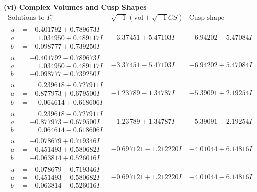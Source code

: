 \documentclass[1p]{elsarticle_modified}
\theoremstyle{definition}
\newcommand{\I}{\sqrt{-1}}
\begin{document}
\newpage\flushleft \textbf{(vi) Complex Volumes and Cusp Shapes}
$$\begin{array}{c|c|c}  
\text{Solutions to }I^u_{1}& \I (\text{vol} + \sqrt{-1}CS) & \text{Cusp shape}\\
 \hline 
\begin{aligned}
u &= -0.401792 + 0.789673 I \\
a &= \phantom{-}1.034950 + 0.489117 I \\
b &= -0.098777 + 0.739250 I\end{aligned}
 & -3.37451 + 5.47103 I & -6.94202 - 5.47084 I \\ \hline\begin{aligned}
u &= -0.401792 - 0.789673 I \\
a &= \phantom{-}1.034950 - 0.489117 I \\
b &= -0.098777 - 0.739250 I\end{aligned}
 & -3.37451 - 5.47103 I & -6.94202 + 5.47084 I \\ \hline\begin{aligned}
u &= \phantom{-}0.239618 + 0.727911 I \\
a &= -0.877973 + 0.679500 I \\
b &= \phantom{-}0.064614 + 0.618606 I\end{aligned}
 & -1.23789 - 1.34787 I & -5.39091 + 2.19254 I \\ \hline\begin{aligned}
u &= \phantom{-}0.239618 - 0.727911 I \\
a &= -0.877973 - 0.679500 I \\
b &= \phantom{-}0.064614 - 0.618606 I\end{aligned}
 & -1.23789 + 1.34787 I & -5.39091 - 2.19254 I \\ \hline\begin{aligned}
u &= -0.078679 + 0.719346 I \\
a &= -0.451493 + 0.580682 I \\
b &= -0.063814 + 0.526016 I\end{aligned}
 & -0.697121 - 1.212220 I & -4.01044 + 6.14816 I \\ \hline\begin{aligned}
u &= -0.078679 - 0.719346 I \\
a &= -0.451493 - 0.580682 I \\
b &= -0.063814 - 0.526016 I\end{aligned}
 & -0.697121 + 1.212220 I & -4.01044 - 6.14816 I \\ \hline\begin{aligned}

\end{aligned}
\end{array}$$
\end{document}
